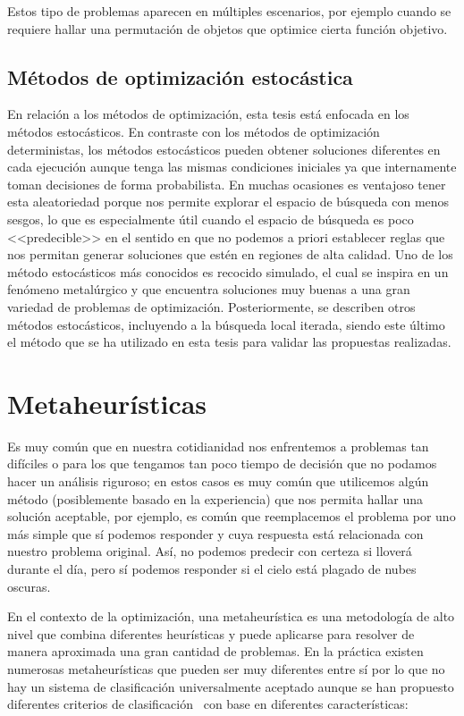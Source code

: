 Estos tipo de problemas aparecen en múltiples escenarios, por ejemplo cuando se requiere hallar una permutación de objetos que optimice cierta función objetivo.

\subsection*{Métodos de optimización estocástica}

En relación a los métodos de optimización, esta tesis está enfocada en los métodos estocásticos.
%
En contraste con los métodos de optimización deterministas, los métodos estocásticos pueden obtener soluciones diferentes en cada ejecución aunque tenga las mismas 
condiciones iniciales ya que internamente toman decisiones de forma probabilista.
%
En muchas ocasiones es ventajoso tener esta aleatoriedad porque nos permite explorar el espacio de búsqueda con menos sesgos, lo que es especialmente útil cuando el 
espacio de búsqueda es poco <<predecible>> en el sentido en que no podemos a priori establecer reglas que nos permitan generar soluciones que estén en regiones de alta
calidad. 
%
Uno de los método estocásticos más conocidos es recocido simulado, el cual se inspira en un fenómeno metalúrgico y que encuentra soluciones muy buenas a una gran 
variedad de problemas de optimización.
%
Posteriormente, se describen otros métodos estocásticos, incluyendo a la búsqueda local iterada, siendo este último el método que se ha utilizado en esta tesis para
validar las propuestas realizadas.





\section{Metaheurísticas}
Es muy común que en nuestra cotidianidad nos enfrentemos a problemas tan difíciles o para los que tengamos tan poco tiempo de decisión que no podamos hacer 
un análisis riguroso;
en estos casos es muy común que utilicemos algún método (posiblemente basado en la experiencia) que nos permita hallar una solución aceptable, por ejemplo, 
es común que reemplacemos el problema por uno más simple que sí podemos responder y cuya respuesta está relacionada con nuestro problema original.
%
Así, no podemos predecir con certeza si lloverá durante el día, pero sí podemos responder si el cielo está plagado de nubes oscuras.

En el contexto de la optimización, una metaheurística es una metodología de alto nivel que combina diferentes heurísticas y puede aplicarse para resolver 
de manera aproximada una gran cantidad de problemas. 
%
En la práctica existen numerosas metaheurísticas que pueden ser muy diferentes entre sí por lo que no hay un sistema de clasificación universalmente aceptado 
aunque se han propuesto diferentes criterios de clasificación~\cite{sorensen2013,Stegherr2020} con base en diferentes características:

